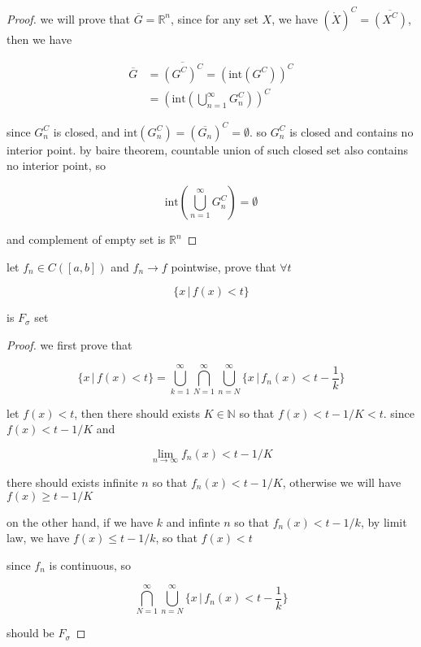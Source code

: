 \documentclass[11pt,a4paper]{article}
\begin{document}
\begin{proof}
    we will prove that $\overline{G} = \mathbb{R}^n$, since for any set $X$, we have $(\mathring{X})^C = \overline{(X^C)}$, then we have

    \begin{align*}
        \overline{G}  &= \overline{(G^C)^C} = (\text{int} (G^C))^C \\
        &= \left(\text{int} \left( \bigcup_{n=1}^{\infty} G_n^C \right)\right)^C
    \end{align*}

    since $G_n^C$ is closed, and $\text{int}(G_n^C) = \left( \overline{G_n} \right)^C = \emptyset$. so $G_n^C$ is closed and contains no interior point. 
    by baire theorem, countable union of such closed set also contains no interior point, so

    \[
        \text{int} \left( \bigcup_{n=1}^{\infty} G_n^C \right) = \emptyset
    \]

    and complement of empty set is $\mathbb{R}^n$
\end{proof}

\begin{exercise}
let $f_n \in C([a,b])$  and $f_n \to f$ pointwise, prove that $\forall t$

\[
\{ x \,\vert\, f(x) < t\}
\]

is $F_{\sigma}$ set


\end{exercise}


\begin{proof}
we first prove that

\[
\{ x \,\vert\, f(x) < t\} = \bigcup_{k=1}^{\infty}\bigcap_{N=1}^{\infty}\bigcup_{n=N}^{\infty} \{ x \,\vert\, f_n(x) < t - \frac{1}{k} \}
\]

let $f(x) < t$, then there should exists $K \in \mathbb{N}$ so that $f(x) < t - 1/K < t$. since $f(x) < t - 1/K$ and

\[
\lim_{n \to \infty}f_n(x) < t - 1/K
\]

there should exists infinite $n$ so that  $f_n(x) < t - 1/K$, otherwise we will have $f(x) \ge t - 1/K$

on the other hand, if we have $k$ and infinte $n$ so that $f_n(x) < t - 1/k$, by limit law, we have $f(x) \le t - 1/k$, so that 
$f(x) < t$

since $f_n$ is continuous, so 

\[
\bigcap_{N=1}^{\infty}\bigcup_{n=N}^{\infty} \{ x \,\vert\, f_n(x) < t - \frac{1}{k} \}
\]

should be $F_{\sigma}$
\end{proof}
\end{document}
